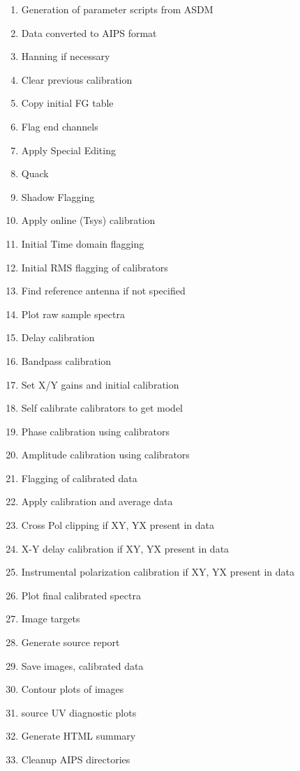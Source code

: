 \documentclass[11pt]{article}
\begin{document}
\begin{enumerate}
\item Generation of parameter scripts from ASDM
\item Data converted to AIPS format
\item Hanning if necessary
\item Clear previous calibration
\item Copy initial FG table 
\item Flag end channels 
\item Apply Special Editing
\item Quack
\item Shadow Flagging 
\item Apply online (Tsys) calibration
\item Initial Time domain flagging
\item Initial RMS flagging of calibrators
\item Find reference antenna if not specified
\item Plot raw sample spectra 
\item Delay calibration
\item Bandpass calibration
\item Set X/Y gains and initial calibration
\item Self calibrate calibrators to get model
\item Phase calibration using calibrators
\item Amplitude calibration using calibrators
\item Flagging of calibrated data
\item Apply calibration and average data
\item Cross Pol clipping if XY, YX present in data
\item X-Y delay calibration if XY, YX present in data
\item Instrumental polarization calibration if XY, YX present in data
\item Plot final calibrated spectra 
\item Image targets
\item Generate source report
\item Save images, calibrated data
\item Contour plots of images
\item source UV diagnostic plots
\item Generate HTML summary
\item Cleanup AIPS directories
\end{enumerate}
\end{document}
